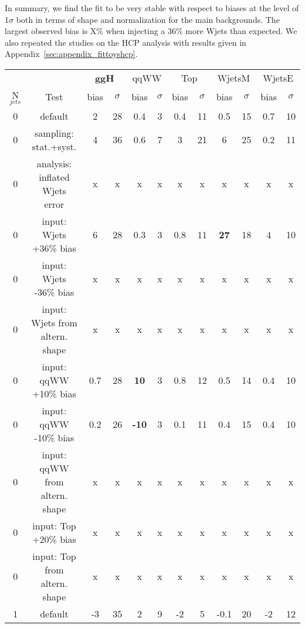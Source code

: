 In summary, we find the fit to be very stable with respect to biases at the level of 1$\sigma$ both in terms of shape and 
normalization for the main backgrounds. The largest observed bias is X\% when injecting a 36\% more Wjets than expected.
We also repeated the studies on the HCP analysis with results given in Appendix~\ref{sec:appendix_fittoyshcp}. 

\begin{table}
\begin{center}
\begin{tabular}{c | c  | c c | c c | c c | c c | c c }
\hline
          &      & \multicolumn{2}{c|}{{\bf ggH}} & \multicolumn{2}{c|}{qqWW} & \multicolumn{2}{c|}{Top} & \multicolumn{2}{c}{WjetsM} & \multicolumn{2}{c}{WjetsE} \\ 
N$_{jets}$ & Test & bias & $\sigma$ & bias & $\sigma$ & bias & $\sigma$ & bias & $\sigma$ & bias & $\sigma$ \\
\hline
0 & default                             &  2  & 28 & 0.4 & 3 & 0.4 & 11 & 0.5 & 15 & 0.7 & 10  \\
0 & sampling: stat.+syst.               &  4  & 36 & 0.6 & 7 &  3  & 21 &  6  & 25 & 0.2 & 11 \\
\hline
0 & analysis: inflated Wjets error      &  x  &  x & x   & x & x   & x  & x   & x  & x  & x\\
0 & input: Wjets +36\% bias             & 6   & 28 & 0.3 & 3 & 0.8 & 11 & {\bf 27}  & 18 & 4  & 10  \\
0 & input: Wjets -36\% bias             &  x  &  x & x   & x & x   & x  & x   & x  & x  & x\\
0 & input: Wjets from altern. shape     & x   & x  & x   & x & x   & x  & x   & x  & x   & x\\
\hline
0 & input: qqWW +10\% bias              & 0.7 & 28 & {\bf 10}  & 3 & 0.8 & 12 & 0.5 & 14 & 0.4 & 10  \\
0 & input: qqWW -10\% bias              & 0.2 & 26 & {\bf -10} & 3 & 0.1 & 11 & 0.4 & 15 & 0.4 & 10 \\
0 & input: qqWW from altern. shape      & x   & x  & x   & x & x   & x  & x   & x  & x   & x\\
\hline
0 & input: Top +20\% bias               & x   & x  & x   & x & x   & x  & x   & x  & x   & x\\
0 & input: Top from altern. shape       & x   & x  & x   & x & x   & x  & x   & x  & x   & x\\
\hline
\hline
1 & default                             & -3  & 35 & 2   & 9  & -2  & 5 & -0.1 & 20 & -2 & 12 \\

\end{tabular}
\end{center}
\end{table}
